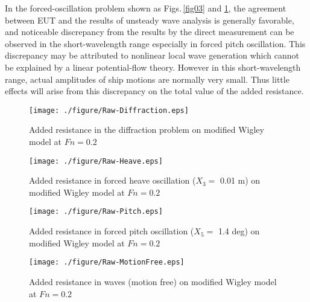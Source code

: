 \documentclass[11pt,fleqn,a3]{article}
\begin{document}
In the forced-oscillation problem shown as Figs.\,\ref{fig03} and \ref{fig04}, 
the agreement between EUT and the results of unsteady wave analysis is 
generally favorable, and noticeable discrepancy from the results by the 
direct measurement can be observed in the short-wavelength range 
especially in forced pitch oscillation.
This discrepancy may be attributed to nonlinear local wave generation 
which cannot be explained by a linear potential-flow theory. 
However in this short-wavelength range, actual amplitudes of ship motions 
are normally very small. Thus little effects will arise from this 
discrepancy on the total value of the added resistance.
\\

\begin{figure}[b]%
\bc
\texttt{[image: ./figure/Raw-Diffraction.eps]}
\ec
\par\vspace*{-7mm}
\caption{Added resistance in the diffraction problem
on modified Wigley model at $Fn=0.2$} \label{fig02}
\bc
\texttt{[image: ./figure/Raw-Heave.eps]}
\ec
\par\vspace*{-7mm}
\caption{Added resistance in forced heave oscillation 
($X_3=$ 0.01 m) on modified Wigley model at $Fn=0.2$} \label{fig03}
\bc
\texttt{[image: ./figure/Raw-Pitch.eps]}
\ec
\par\vspace*{-7mm}
\caption{Added resistance in forced pitch oscillation 
($X_5=$ 1.4 deg) on modified Wigley model at $Fn=0.2$} \label{fig04}
\end{figure}

\begin{figure}[tbh]%
\bc
\texttt{[image: ./figure/Raw-MotionFree.eps]}
\ec
\par\vspace*{-7mm}
\caption{Added resistance in waves (motion free) 
on modified Wigley model at $Fn=0.2$} \label{fig05}
\par\vspace*{-1mm}
\end{figure}
\end{document}
